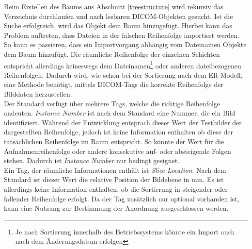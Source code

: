 Beim Erstellen des Baums aus Abschnitt \ref{treestructure} wird rekursiv das Verzeichnis durchlaufen und nach lesbaren DICOM-Objekten gesucht. Ist die Suche erfolgreich, wird das Objekt dem Baum hinzugefügt. Hierbei kann das Problem auftreten, dass Dateien in der falschen Reihenfolge importiert werden. So kann es passieren, dass ein Importvorgang abhängig vom Dateinamen Objekte dem Baum hinzufügt. Die räumliche Reihenfolge der einzelnen Schichten entspricht allerdings keineswegs dem Dateinamen\footnote{Je nach Sortierung innerhalb des Betriebssystems könnte ein Import auch nach dem Änderungsdatum erfolgen} oder anderen dateibezogenen Reihenfolgen. Dadurch wird, wie schon bei der Sortierung nach dem ER-Modell, eine Methode benötigt, mittels DICOM-Tags die korrekte Reihenfolge der Bilddaten herzustellen.\\
Der Standard verfügt über mehrere Tags, welche die richtige Reihenfolge andeuten. \textit{Instance Number} ist nach dem Standard \cite[C.7.6.1]{dicom:iod} eine Nummer, die ein Bild identifiziert. Während der Entwicklung entsprach dieser Wert der Testbilder der dargestellten Reihenfolge, jedoch ist keine Information enthalten ob diese der tatsächlichen Reihenfolge im Raum entspricht. So könnte der Wert für die Aufnahmenreihenfolge oder andere konsekutive auf- oder absteigende Folgen stehen. Dadurch ist \textit{Instance Number} nur bedingt geeignet.\\
Ein Tag, der räumliche Informationen enthält ist \textit{Slice Location}. Nach dem Standard \cite[C.7.6.2]{dicom:iod} ist dieser Wert die relative Position der Bildebene in mm. Es ist allerdings keine Information enthalten, ob die Sortierung in steigender oder fallender Reihenfolge erfolgt. Da der Tag zusätzlich nur optional vorhanden ist, kann eine Nutzung zur Bestimmung der Anordnung ausgeschlossen werden.

